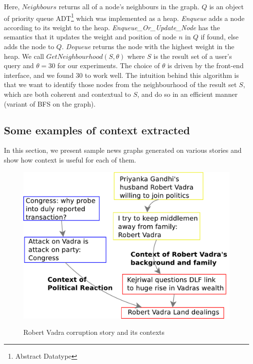 Here, $Neighbours$ returns all of a node's neighbours in the graph. $Q$ is an object of priority queue ADT\footnote{Abstract Datatype} which was implemented as a heap. \emph{Enqueue} adds a node according to its weight to the heap. \emph{Enqueue\_Or\_Update\_Node} has the semantics that it updates the weight and position of node $n$ in $Q$ if found, else adds the node to $Q$.
\emph{Dequeue} returns the node with the highest weight in the heap. We call $GetNeighbourhood(S, \theta)$ where $S$ is the result set of a user's query and $\theta = 30$ for our experiments. The choice of $\theta$ is driven by the front-end interface, and we found 30 to work well.
The intuition behind this algorithm is that we want to identify those nodes from the neighbourhood of the result set $S$, which are both coherent and contextual to $S$, and do so in an efficient manner (variant of BFS on the graph).

\subsection{Some examples of context extracted}
In this section, we present sample news graphs generated on various stories and show how context is useful for each of them.

\begin{figure}
\caption{Robert Vadra corruption story and its contexts}
\includegraphics[scale=0.30]{figures/graph-vadra.pdf}
\label{fig:vadra-corruption}
\end{figure}

